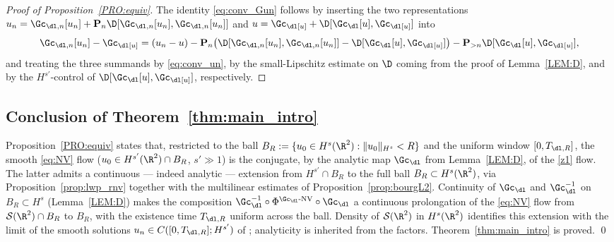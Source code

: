 \begin{proof}[Proof of Proposition~\textup{\ref{PRO:equiv}}]
The identity \eqref{eq:conv_Gun} follows by inserting the two
representations
$u_n=\Gc_{\dl,n}[u_n]+\mathbf{P}_n\D[\Gc_{\dl,n}[u_n],\Gc_{\dl,n}[u_n]]$
and $u=\Gc_\dl[u]+\D[\Gc_\dl[u],\Gc_\dl[u]]$ into
\[
\Gc_{\dl,n}[u_n]-\Gc_\dl[u]
= (u_n-u)
- \mathbf{P}_n\big(\D[\Gc_{\dl,n}[u_n],\Gc_{\dl,n}[u_n]]
- \D[\Gc_\dl[u],\Gc_\dl[u]]\big)
- \mathbf{P}_{>n}\D[\Gc_\dl[u],\Gc_\dl[u]],
\]
and treating the three summands by \eqref{eq:conv_un}, by the
small-Lipschitz estimate on $\D$ coming from the proof of
Lemma~\ref{LEM:D}, and by the $H^{s'}$-control of
$\D[\Gc_\dl[u],\Gc_\dl[u]]$, respectively.
\end{proof}

\subsection{Conclusion of Theorem~\ref{thm:main_intro}}

Proposition~\ref{PRO:equiv} states that, restricted to the ball
$B_R:=\{u_0\in H^s(\R^2):\|u_0\|_{H^s}<R\}$ and the uniform window
$[0,T_{\dl,R}]$, the smooth \eqref{eq:NV} flow
($u_0\in H^{s'}(\R^2)\cap B_R$, $s'\gg 1$) is the conjugate, by the
analytic map $\Gc_\dl$ from Lemma~\ref{LEM:D}, of the \eqref{z1}
flow. The latter admits a continuous --- indeed analytic ---
extension from $H^{s'}\cap B_R$ to the full ball $B_R\subset H^s(\R^2)$,
via Proposition~\ref{prop:lwp_rnv} together with the multilinear
estimates of Proposition~\ref{prop:bourgL2}. Continuity of $\Gc_\dl$
and $\Gc_\dl^{-1}$ on $B_R\subset H^s$ (Lemma~\ref{LEM:D}) makes the
composition
$\Gc_\dl^{-1}\circ\Phi^{\Gc_\dl\text{-NV}}\circ\Gc_\dl$
a continuous prolongation of the \eqref{eq:NV} flow from
$\mathcal{S}(\R^2)\cap B_R$ to $B_R$, with the existence time
$T_{\dl,R}$ uniform across the ball. Density of
$\mathcal{S}(\R^2)$ in $H^s(\R^2)$ identifies this extension with
the limit of the smooth solutions
$u_n\in C([0,T_{\dl,R}];H^{s'})$ of
\cite{angelopolous,kazeykinamunoz1,kazeykinamunoz2}; analyticity is
inherited from the factors. Theorem~\ref{thm:main_intro} is
proved.
\qed
